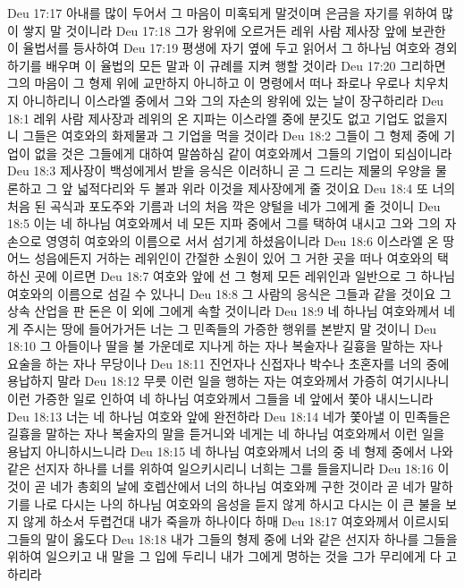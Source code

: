 Deu 17:17  아내를 많이 두어서 그 마음이 미혹되게 말것이며 은금을 자기를 위하여 많이 쌓지 말 것이니라
Deu 17:18  그가 왕위에 오르거든 레위 사람 제사장 앞에 보관한 이 율법서를 등사하여
Deu 17:19  평생에 자기 옆에 두고 읽어서 그 하나님 여호와 경외하기를 배우며 이 율법의 모든 말과 이 규례를 지켜 행할 것이라
Deu 17:20  그리하면 그의 마음이 그 형제 위에 교만하지 아니하고 이 명령에서 떠나 좌로나 우로나 치우치지 아니하리니 이스라엘 중에서 그와 그의 자손의 왕위에 있는 날이 장구하리라
Deu 18:1  레위 사람 제사장과 레위의 온 지파는 이스라엘 중에 분깃도 없고 기업도 없을지니 그들은 여호와의 화제물과 그 기업을 먹을 것이라
Deu 18:2  그들이 그 형제 중에 기업이 없을 것은 그들에게 대하여 말씀하심 같이 여호와께서 그들의 기업이 되심이니라
Deu 18:3  제사장이 백성에게서 받을 응식은 이러하니 곧 그 드리는 제물의 우양을 물론하고 그 앞 넓적다리와 두 볼과 위라 이것을 제사장에게 줄 것이요
Deu 18:4  또 너의 처음 된 곡식과 포도주와 기름과 너의 처음 깍은 양털을 네가 그에게 줄 것이니
Deu 18:5  이는 네 하나님 여호와께서 네 모든 지파 중에서 그를 택하여 내시고 그와 그의 자손으로 영영히 여호와의 이름으로 서서 섬기게 하셨음이니라
Deu 18:6  이스라엘 온 땅 어느 성읍에든지 거하는 레위인이 간절한 소원이 있어 그 거한 곳을 떠나 여호와의 택하신 곳에 이르면
Deu 18:7  여호와 앞에 선 그 형제 모든 레위인과 일반으로 그 하나님 여호와의 이름으로 섬길 수 있나니
Deu 18:8  그 사람의 응식은 그들과 같을 것이요 그 상속 산업을 판 돈은 이 외에 그에게 속할 것이니라
Deu 18:9  네 하나님 여호와께서 네게 주시는 땅에 들어가거든 너는 그 민족들의 가증한 행위를 본받지 말 것이니
Deu 18:10  그 아들이나 딸을 불 가운데로 지나게 하는 자나 복술자나 길흉을 말하는 자나 요술을 하는 자나 무당이나
Deu 18:11  진언자나 신접자나 박수나 초혼자를 너의 중에 용납하지 말라
Deu 18:12  무릇 이런 일을 행하는 자는 여호와께서 가증히 여기시나니 이런 가증한 일로 인하여 네 하나님 여호와께서 그들을 네 앞에서 쫓아 내시느니라
Deu 18:13  너는 네 하나님 여호와 앞에 완전하라
Deu 18:14  네가 쫓아낼 이 민족들은 길흉을 말하는 자나 복술자의 말을 듣거니와 네게는 네 하나님 여호와께서 이런 일을 용납지 아니하시느니라
Deu 18:15  네 하나님 여호와께서 너의 중 네 형제 중에서 나와 같은 선지자 하나를 너를 위하여 일으키시리니 너희는 그를 들을지니라
Deu 18:16  이것이 곧 네가 총회의 날에 호렙산에서 너의 하나님 여호와께 구한 것이라 곧 네가 말하기를 나로 다시는 나의 하나님 여호와의 음성을 듣지 않게 하시고 다시는 이 큰 불을 보지 않게 하소서 두렵건대 내가 죽을까 하나이다 하매
Deu 18:17  여호와께서 이르시되 그들의 말이 옳도다
Deu 18:18  내가 그들의 형제 중에 너와 같은 선지자 하나를 그들을 위하여 일으키고 내 말을 그 입에 두리니 내가 그에게 명하는 것을 그가 무리에게 다 고하리라
